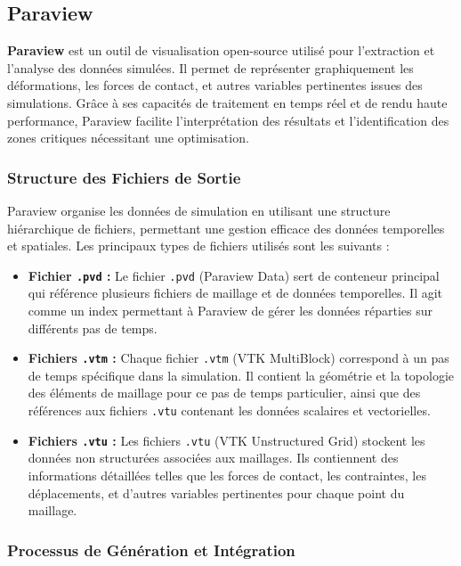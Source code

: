 \subsection{Paraview}

\textbf{Paraview} est un outil de visualisation open-source utilisé pour l'extraction et l'analyse des données simulées. Il permet de représenter graphiquement les déformations, les forces de contact, et autres variables pertinentes issues des simulations. Grâce à ses capacités de traitement en temps réel et de rendu haute performance, Paraview facilite l'interprétation des résultats et l'identification des zones critiques nécessitant une optimisation.

\subsubsection{Structure des Fichiers de Sortie}

Paraview organise les données de simulation en utilisant une structure hiérarchique de fichiers, permettant une gestion efficace des données temporelles et spatiales. Les principaux types de fichiers utilisés sont les suivants :

\begin{itemize}
    \item \textbf{Fichier \texttt{.pvd} :}  
    Le fichier \texttt{.pvd} (Paraview Data) sert de conteneur principal qui référence plusieurs fichiers de maillage et de données temporelles. Il agit comme un index permettant à Paraview de gérer les données réparties sur différents pas de temps.
    
    \item \textbf{Fichiers \texttt{.vtm} :}  
    Chaque fichier \texttt{.vtm} (VTK MultiBlock) correspond à un pas de temps spécifique dans la simulation. Il contient la géométrie et la topologie des éléments de maillage pour ce pas de temps particulier, ainsi que des références aux fichiers \texttt{.vtu} contenant les données scalaires et vectorielles.
    
    \item \textbf{Fichiers \texttt{.vtu} :}  
    Les fichiers \texttt{.vtu} (VTK Unstructured Grid) stockent les données non structurées associées aux maillages. Ils contiennent des informations détaillées telles que les forces de contact, les contraintes, les déplacements, et d'autres variables pertinentes pour chaque point du maillage.
\end{itemize}

\subsubsection{Processus de Génération et Intégration}

